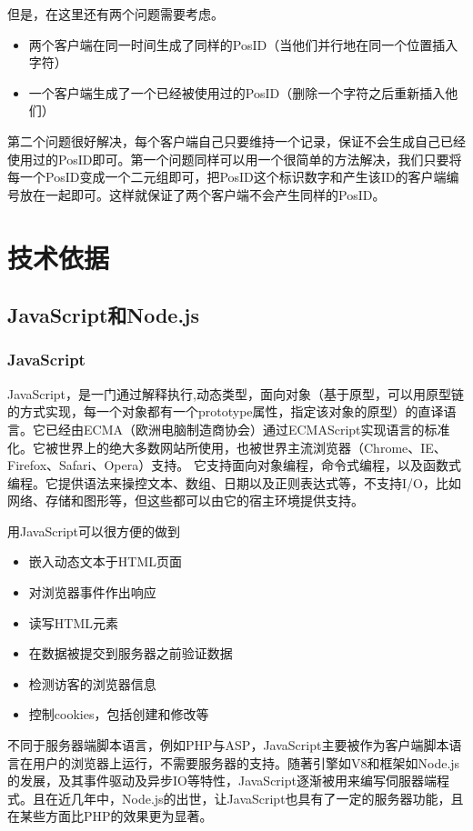 \documentclass[11pt]{ctexart}
\begin{document}
但是，在这里还有两个问题需要考虑。
\begin{itemize}
	\item 两个客户端在同一时间生成了同样的PosID（当他们并行地在同一个位置插入字符）
	\item 一个客户端生成了一个已经被使用过的PosID（删除一个字符之后重新插入他们）
\end{itemize}

第二个问题很好解决，每个客户端自己只要维持一个记录，保证不会生成自己已经使用过的PosID即可。第一个问题同样可以用一个很简单的方法解决，我们只要将每一个PosID变成一个二元组即可，把PosID这个标识数字和产生该ID的客户端编号放在一起即可。这样就保证了两个客户端不会产生同样的PosID。

\section{技术依据}
\subsection{JavaScript和Node.js}
\subsubsection{JavaScript}
JavaScript，是一门通过解释执行,动态类型，面向对象（基于原型，可以用原型链的方式实现，每一个对象都有一个prototype属性，指定该对象的原型）的直译语言。它已经由ECMA（欧洲电脑制造商协会）通过ECMAScript实现语言的标准化。它被世界上的绝大多数网站所使用，也被世界主流浏览器（Chrome、IE、Firefox、Safari、Opera）支持。
它支持面向对象编程，命令式编程，以及函数式编程。它提供语法来操控文本、数组、日期以及正则表达式等，不支持I/O，比如网络、存储和图形等，但这些都可以由它的宿主环境提供支持。

用JavaScript可以很方便的做到
\begin{itemize}
	\item 嵌入动态文本于HTML页面
	\item 对浏览器事件作出响应
	\item 读写HTML元素
	\item 在数据被提交到服务器之前验证数据
	\item 检测访客的浏览器信息
	\item 控制cookies，包括创建和修改等
\end{itemize}

不同于服务器端脚本语言，例如PHP与ASP，JavaScript主要被作为客户端脚本语言在用户的浏览器上运行，不需要服务器的支持。随著引擎如V8和框架如Node.js的发展，及其事件驱动及异步IO等特性，JavaScript逐渐被用来编写伺服器端程式。且在近几年中，Node.js的出世，让JavaScript也具有了一定的服务器功能，且在某些方面比PHP的效果更为显著。
\end{document}
